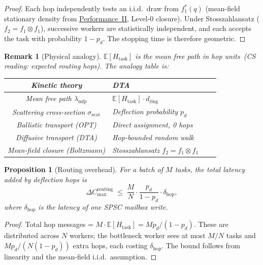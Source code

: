 \documentclass[11pt,a4paper]{report}
\newtheorem{proposition}[theorem]{Proposition}
\newtheorem{remark}{Remark}[section]
\newcommand{\physics}[2]{#1\ \textnormal{(\emph{CS reading}: #2)}}
\begin{document}
\begin{proof}
Each hop independently tests an i.i.d.\ draw from $f_1^*(q)$ (mean-field
stationary density from \hyperref[chap:kinetic_theory]{Performance~II}, Level-0 closure).
Under Stosszahlansatz ($f_2 = f_1 \otimes f_1$), successive workers are
statistically independent, and each accepts the task with probability
$1 - p_d$.  The stopping time is therefore geometric.
\end{proof}

\begin{remark}[Physical analogy]
$\mathbb{E}[H_{\mathrm{task}}]$ is the \physics{mean free path in hop units}
{expected routing hops}.  The analogy table is:
\medskip

\noindent
\begin{tabularx}{\textwidth}{@{}clXl@{}}
\toprule
Kinetic theory & DTA \\
\midrule
Mean free path $\lambda_{\mathrm{mfp}}$ & $\mathbb{E}[H_{\mathrm{task}}]\cdot d_{\mathrm{ring}}$ \\
Scattering cross-section $\sigma_{\mathrm{scat}}$ & Deflection probability $p_d$ \\
Ballistic transport (OPT) & Direct assignment, 0 hops \\
Diffusive transport (DTA) & Hop-bounded random walk \\
Mean-field closure (Boltzmann) & Stosszahlansatz $f_2 = f_1 \otimes f_1$ \\
\bottomrule
\end{tabularx}
\end{remark}

\begin{proposition}[Routing overhead]\label{prop:routing_overhead}
For a batch of $M$ tasks, the total latency added by deflection hops is
\[
  \Delta C_{\max}^{\mathrm{routing}}
  \;\le\;
  \frac{M}{N} \cdot \frac{p_d}{1 - p_d} \cdot \delta_{\mathrm{hop}},
\]
where $\delta_{\mathrm{hop}}$ is the latency of one SPSC mailbox write.
\end{proposition}

\begin{proof}
Total hop messages = $M \cdot \mathbb{E}[H_{\mathrm{task}}] = M p_d/(1-p_d)$.
These are distributed across $N$ workers; the bottleneck worker sees at most
$M/N$ tasks and $M p_d / (N(1-p_d))$ extra hops, each costing $\delta_{\mathrm{hop}}$.
The bound follows from linearity and the mean-field i.i.d.\ assumption.
\end{proof}

\end{document}
